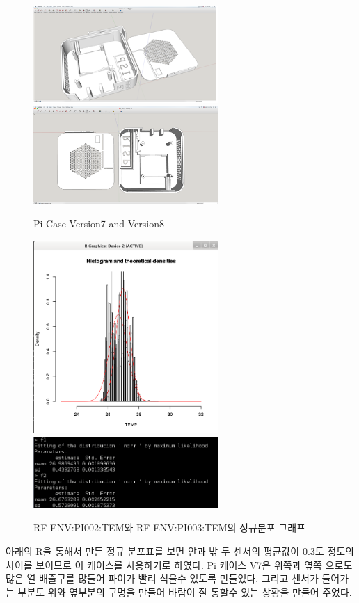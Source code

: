 \documentclass[11pt
  , a4paper
  , article
  , oneside
]{memoir}
\begin{document}
\begin{center}
	\begin{figure}[h]
		\includegraphics[width=7cm]{./images/V7.png}
		\includegraphics[width=7cm]{./images/V8.png}
		\caption{Pi Case Version7 and Version8}
	\end{figure}
\end{center}
\begin{center}
	\begin{figure}[h]
		\includegraphics[width=7cm]{./images/R.png}\\
		\includegraphics[width=7cm]{./images/157.png}
		\caption{RF-ENV:PI002:TEM와 RF-ENV:PI003:TEM의 정규분포 그래프}
	\end{figure}
\end{center}
아래의 R을 통해서 만든 정규 분포표를 보면 안과 밖 두 센서의 평균값이 0.3도 정도의 차이를 보이므로 이 케이스를 사용하기로 하였다.
Pi 케이스 V7은 위쪽과 옆쪽 으로도 많은 열 배출구를 많들어 파이가 빨리 식을수 있도록 만들었다. 그리고 센서가 들어가는 부분도 위와 옆부분의 구멍을 만들어 바람이 잘 통할수 있는 상황을 만들어 주었다.
\clearpage
\end{document}
